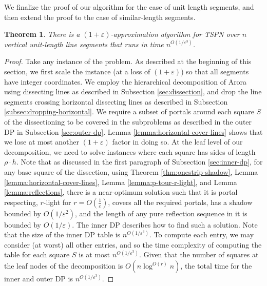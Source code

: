 \documentclass[pdflatex,sn-mathphys-num]{sn-jnl}
\theoremstyle{thmstyleone}
\newtheorem{theorem}{Theorem}
\newcommand{\eps}{\varepsilon}
\begin{document}
We finalize the proof of our algorithm for the case of unit length segments, and then extend the proof to the case of similar-length segments.

\begin{theorem}\label{thm:main2}
    There is a $ (1+\eps) $-approximation algorithm for TSPN over $ n $ vertical unit-length line segments that runs in time $n^{O(1/\eps^3)}$.
\end{theorem}

\begin{proof}
	Take any instance of the problem.
	As described at the beginning of this section,  we first scale the instance (at a loss of $(1+\eps)$)
	so that all segments have integer coordinates. We employ the hierarchical decomposition of Arora using dissecting lines
	as described in Subsection \ref{sec:dissection}, and drop the line segments crossing horizontal dissecting lines as described in Subsection \ref{subsec:dropping-horizontal}. We require a subset of
	portals around each square $ S $ of the dissectioning to be covered in the subproblems as described in the outer DP in Subsection \ref{sec:outer-dp}. Lemma \ref{lemma:horizontal-cover-lines} shows that we lose at most another $(1+\eps)$ factor in doing so. At the leaf level of our decomposition, we need to solve instances where
	each square has sides of length $\rho\cdot h$. Note that as discussed in the first paragraph of Subsection \ref{sec:inner-dp}, for any base square of the dissection, using Theorem \ref{thm:onestrip-shadow}, Lemma \ref{lemma:horizontal-cover-lines}, Lemma \ref{lemma:p-tour-r-light}, and Lemma \ref{lemma:reflections}, there is a near-optimum solution such that it is portal respecting, $r$-light for $ r = O(\frac1\eps) $, covers all the required portals, has a shadow bounded by $O(1/\eps^2)$, and the length
	of any pure reflection sequence in it is bounded by $O(1/\eps)$. The inner DP describes how to find such a solution. Note that the size of the inner DP table is $n^{O(1/\eps^3)}$. To compute each entry, we may consider (at worst) all other entries, and so the time complexity of computing the table for each
	square $S$ is at most $n^{O(1/\eps^3)}$. Given that the number of squares at the leaf nodes of the decomposition is $O(n\log^{O(r)} n)$, the total time for the inner and outer DP is $n^{O(1/\eps^3)}$.
\end{proof}

\end{document}
